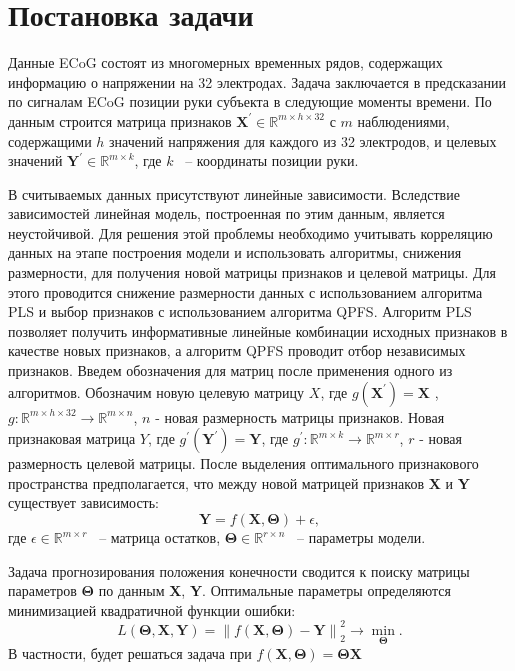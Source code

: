 \documentclass[12pt,twoside]{article}
\newcommand{\norm}[1]{\left\lVert#1\right\rVert}
\begin{document}
\section{Постановка задачи}

Данные ECoG состоят из многомерных временных рядов, содержащих информацию о напряжении на 32 электродах. Задача заключается в предсказании по сигналам ECoG позиции руки субъекта в следующие моменты времени. По данным строится матрица 
признаков $\textbf{X}^\prime \in \mathbb{R}^{m\times h \times 32}$ с $m$ наблюдениями, содержащими $h$ значений напряжения для каждого из 32 электродов, и целевых значений $\textbf{Y}^\prime \in \mathbb{R}^{m\times k}$, где $k$ ~-- координаты позиции руки.

В считываемых данных присутствуют линейные зависимости. Вследствие зависимостей линейная модель, построенная по этим данным, является неустойчивой. Для решения этой проблемы необходимо учитывать корреляцию данных на этапе построения модели и использовать алгоритмы,
снижения размерности, для получения новой матрицы признаков и целевой матрицы.  Для этого проводится снижение размерности данных с использованием алгоритма PLS и выбор признаков с использованием алгоритма QPFS. Алгоритм PLS позволяет получить информативные линейные комбинации исходных признаков в качестве новых признаков, а алгоритм QPFS проводит отбор независимых признаков. Введем обозначения для матриц после применения одного из алгоритмов. Обозначим новую целевую матрицу $X$, где $g(\textbf{X}^\prime) = \textbf{X}$ , $g: \mathbb{R}^{m\times h \times 32} \to \mathbb{R}^{m\times n} $, $n$ - новая размерность матрицы признаков. Новая признаковая матрица $Y$, где $g^\prime(\textbf{Y}^\prime) = \textbf{Y}$, где $g^\prime: \mathbb{R}^{m\times k} \to \mathbb{R}^{m\times r} $, $r$ - новая размерность целевой матрицы. После выделения оптимального признакового пространства предполагается, что между новой матрицей признаков \textbf{X} и \textbf{Y} существует зависимость: $$ \textbf{Y} = f(\boldsymbol{X},\boldsymbol{\Theta}) + \epsilon ,$$ где $\epsilon \in \mathbb{R}^{m\times r}$ ~-- матрица остатков, $ \boldsymbol{\Theta} \in \mathbb{R}^{r\times n}$ ~-- параметры модели. 

Задача прогнозирования положения конечности сводится к поиску матрицы параметров $ \boldsymbol{\Theta}$ по данным \textbf{X}, \textbf{Y}. Оптимальные параметры определяются минимизацией квадратичной функции ошибки:
$$ L( \boldsymbol{\Theta}, \textbf{X}, \textbf{Y}) = \norm{ f(\boldsymbol{X},\boldsymbol{\Theta})  - \textbf{Y}}^2_2 \to \min_{\boldsymbol{\Theta}}. $$ В частности, будет решаться задача при $f(\boldsymbol{X},\boldsymbol{\Theta}) = \boldsymbol{\Theta} \textbf{X}$


{}

\end{document}
